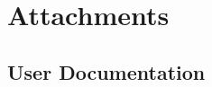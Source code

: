 \documentclass[12pt,a4paper]{report}
\begin{document}



\tableofcontents









%
\printbibliography

\listoffigures



\appendix
\chapter{Attachments}

\section{User Documentation}
\end{document}
